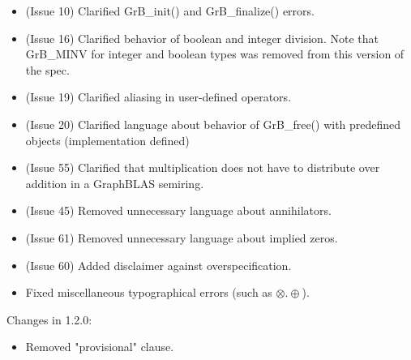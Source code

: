 \begin{itemize}
\item (Issue 10) Clarified {\sf GrB\_init()} and {\sf GrB\_finalize()} errors.
\item (Issue 16) Clarified behavior of boolean and integer division. {\color{red} Note that {\sf GrB\_MINV} for integer and boolean types was removed from this version of the spec.}
\item (Issue 19) Clarified aliasing in user-defined operators.
\item (Issue 20) Clarified language about behavior of {\sf GrB\_free()} with predefined objects (implementation defined)
\item (Issue 55) Clarified that multiplication does not have to distribute over addition in a GraphBLAS semiring.
\item (Issue 45) Removed unnecessary language about annihilators.
\item (Issue 61) Removed unnecessary language about implied zeros.
\item (Issue 60) Added disclaimer against overspecification.
\item Fixed miscellaneous typographical errors (such as $\otimes.\oplus$).
\end{itemize}


Changes in 1.2.0:
\begin{itemize}
\item Removed "provisional" clause.
\end{itemize}


